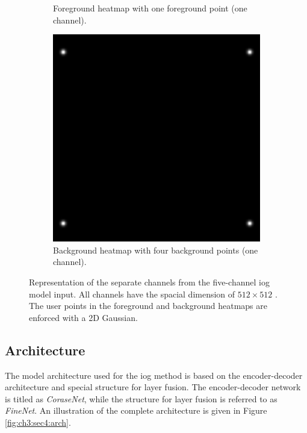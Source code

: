\begin{figure}
\begin{subfigure}[b]{0.3\textwidth}
		\caption{Foreground heatmap with one foreground point (one channel).}
		\label{fig:ch3:sec4:fg_channel}
	\end{subfigure}
	\hfill
	\begin{subfigure}[b]{0.3\textwidth}
		\centering
		\includegraphics[width=\textwidth]{figures/chap34_channel_bg.png}
		\caption{Background heatmap with four background points (one channel).}
		\label{fig:ch3:sec4:bg_channel}
	\end{subfigure}
	\caption[Five-channel IOG model input]{
		Representation of the separate channels from the five-channel \gls{iog} model input.
		All channels have the spacial dimension of $512 \times 512$ .
		The user points in the foreground and background heatmaps are enforced with a 2D Gaussian.
	} \label{fig:ch3:sec4:model_input_channels}
\end{figure}

\subsection{Architecture}\label{ord:ch3:sec4:subsec3}

The model architecture used for the \gls{iog} method is based on the encoder-decoder architecture and special structure for layer fusion.
The encoder-decoder network is titled as \textit{CoraseNet}, while the structure for layer fusion is referred to as \textit{FineNet}.
An illustration of the complete architecture is given in Figure \ref{fig:ch3:sec4:arch}.


